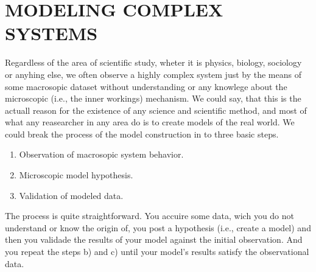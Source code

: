 \chapter{MODELING COMPLEX SYSTEMS}
\label{chap:similary_of_nonlinear_systems}
\thispagestyle{empty}


Regardless of the area of scientific study, wheter it is physics, biology, sociology or anyhing else, we often observe a highly complex system just by the means of some macrosopic dataset without understanding or any knowlege about the microscopic (i.e., the inner workings) mechanism. We could say, that this is the actuall reason for the existence of any science and scientific method, and most of what any reasearcher in any area do is to create models of the real world. We could break the process of the model construction in to three basic steps. 

\begin{enumerate}[label=\alph*)]
    \item{Observation of macrosopic system behavior.}
    \item{Microscopic model hypothesis.}
    \item{Validation of modeled data.}
\end{enumerate}

The process is quite straightforward. You accuire some data, wich you do not understand or know the origin of, you post a hypothesis (i.e., create a model) and then you validade the results of your model against the initial observation. And you repeat the steps b) and c) until your model's results satisfy the observational data. 

%




